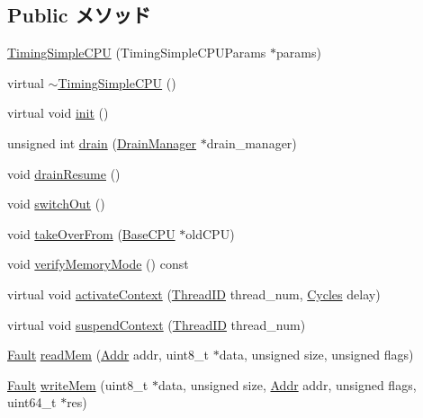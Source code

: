 \subsection*{Public メソッド}
\begin{DoxyCompactItemize}
\item 
\hyperlink{classTimingSimpleCPU_a6d8b5c088e0456abaaf000e46e346319}{TimingSimpleCPU} (TimingSimpleCPUParams $\ast$params)
\item 
virtual \hyperlink{classTimingSimpleCPU_a637e8aedb9fa159bd5480f48e6574832}{$\sim$TimingSimpleCPU} ()
\item 
virtual void \hyperlink{classTimingSimpleCPU_a02fd73d861ef2e4aabb38c0c9ff82947}{init} ()
\item 
unsigned int \hyperlink{classTimingSimpleCPU_a4e932bfc8aa6dfb998b8496a0f04ace3}{drain} (\hyperlink{classDrainManager}{DrainManager} $\ast$drain\_\-manager)
\item 
void \hyperlink{classTimingSimpleCPU_a8f020d3237536fe007fc488c4125c5d8}{drainResume} ()
\item 
void \hyperlink{classTimingSimpleCPU_a05f299b443f8cc73a93d61572edc0218}{switchOut} ()
\item 
void \hyperlink{classTimingSimpleCPU_ac82d2b8d331b2e8e6854a95d2917dfa2}{takeOverFrom} (\hyperlink{classBaseCPU_1_1BaseCPU}{BaseCPU} $\ast$oldCPU)
\item 
void \hyperlink{classTimingSimpleCPU_ae2e1ccebe596a180f8105d57f9a93645}{verifyMemoryMode} () const 
\item 
virtual void \hyperlink{classTimingSimpleCPU_ad7a501b28bdbe8b3e708cd1ef69ac191}{activateContext} (\hyperlink{base_2types_8hh_ab39b1a4f9dad884694c7a74ed69e6a6b}{ThreadID} thread\_\-num, \hyperlink{classCycles}{Cycles} delay)
\item 
virtual void \hyperlink{classTimingSimpleCPU_a1dad4c4d2c3df4ef367e14fcc973ce74}{suspendContext} (\hyperlink{base_2types_8hh_ab39b1a4f9dad884694c7a74ed69e6a6b}{ThreadID} thread\_\-num)
\item 
\hyperlink{classRefCountingPtr}{Fault} \hyperlink{classTimingSimpleCPU_a66191b2d8a45050b7df3c3efa7bb07c6}{readMem} (\hyperlink{base_2types_8hh_af1bb03d6a4ee096394a6749f0a169232}{Addr} addr, uint8\_\-t $\ast$data, unsigned size, unsigned flags)
\item 
\hyperlink{classRefCountingPtr}{Fault} \hyperlink{classTimingSimpleCPU_ad46c5edeb1ee9b60445f3e26364e2c5e}{writeMem} (uint8\_\-t $\ast$data, unsigned size, \hyperlink{base_2types_8hh_af1bb03d6a4ee096394a6749f0a169232}{Addr} addr, unsigned flags, uint64\_\-t $\ast$res)

\end{DoxyCompactItemize}
